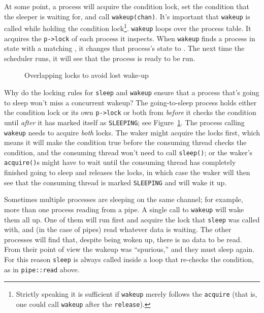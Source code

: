 At some point, a process will acquire the condition lock,
set the condition that the sleeper is waiting for,
and call \lstinline{wakeup(chan)}.
It's important that \lstinline{wakeup} is called
while holding the condition lock\footnote{%
Strictly speaking it is sufficient if
\lstinline{wakeup}
merely follows the
\lstinline{acquire}
(that is, one could call
\lstinline{wakeup}
after the
\lstinline{release}).%
}.
\lstinline{wakeup}
loops over the process table.
It acquires the
\lstinline{p->lock}
of each process it inspects.
When \lstinline{wakeup} finds a process in state
with a matching
,
it changes that process's state to
.
The next time the scheduler runs, it will
see that the process is ready to be run.

\begin{figure}[t]
  
  \caption{Overlapping locks to avoid lost wake-up}
  \label{fig:overlap}
\end{figure}

Why do the locking rules for
\lstinline{sleep}
and
\lstinline{wakeup}
ensure that a process that's going to sleep
won't miss a concurrent wakeup?
The going-to-sleep process holds either
the condition lock or its own
\lstinline{p->lock}
or both from \textit{before} it checks the condition
until \textit{after} it has marked itself as \texttt{SLEEPING};
see Figure~\ref{fig:overlap}.
The process calling \texttt{wakeup} needs to acquire \textit{both}
locks.
The waker might acquire the locks first, which means
it will make the condition true before the consuming
thread checks the condition, and the consuming thread
won't need to call \lstinline{sleep()};
or the waker's \lstinline{acquire()}s might have to wait until the consuming
thread has completely finished going to sleep and
releases the locks, in which case the waker will then see
that the consuming thread is marked \texttt{SLEEPING}
and will wake it up.

Sometimes multiple processes are sleeping
on the same channel; for example, more than one process
reading from a pipe.
A single call to
\lstinline{wakeup}
will wake them all up.
One of them will run first and acquire the lock that
\lstinline{sleep}
was called with, and (in the case of pipes) read whatever
data is waiting.
The other processes will find that, despite being woken up,
there is no data to be read.
From their point of view the wakeup was ``spurious,'' and
they must sleep again.
For this reason \lstinline{sleep} is always called inside a loop that
re-checks the condition, as in \lstinline{pipe::read} above.

